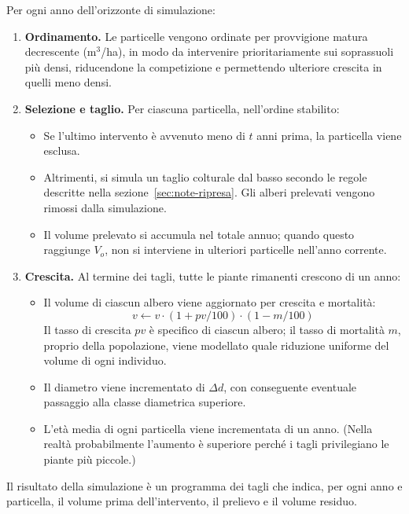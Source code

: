 \documentclass[a4paper,11pt]{article}
\begin{document}
Per ogni anno dell'orizzonte di simulazione:

\begin{enumerate}
    \item \textbf{Ordinamento.} Le particelle vengono ordinate per provvigione matura decrescente (m$^3$/ha), in modo da intervenire prioritariamente sui soprassuoli più densi, riducendone la competizione e permettendo ulteriore crescita in quelli meno densi.
    \item \textbf{Selezione e taglio.} Per ciascuna particella, nell'ordine stabilito:
    \begin{itemize}
        \item Se l'ultimo intervento è avvenuto meno di $t$ anni prima, la particella viene esclusa.
        \item Altrimenti, si simula un taglio colturale dal basso secondo le regole descritte nella sezione~\ref{sec:note-ripresa}. Gli alberi prelevati vengono rimossi dalla simulazione.
        \item Il volume prelevato si accumula nel totale annuo; quando questo raggiunge $V_o$, non si interviene in ulteriori particelle nell'anno corrente.
    \end{itemize}

    \item \textbf{Crescita.} Al termine dei tagli, tutte le piante rimanenti crescono di un anno:
    \begin{itemize}
        \item Il volume di ciascun albero viene aggiornato per crescita e mortalità:
        \[v \leftarrow v\cdot(1 + pv/100)\cdot(1 - m/100) \]
        Il tasso di crescita $pv$ è specifico di ciascun albero; il tasso di mortalità $m$, proprio della popolazione, viene modellato quale riduzione uniforme del volume di ogni individuo.
        \item Il diametro viene incrementato di $\Delta d$, con conseguente eventuale passaggio alla classe diametrica superiore.
        \item L'età media di ogni particella viene incrementata di un anno. (Nella realtà probabilmente l'aumento è superiore perché i tagli privilegiano le piante più piccole.)
    \end{itemize}
\end{enumerate}

Il risultato della simulazione è un programma dei tagli che indica, per ogni anno e particella, il volume prima dell'intervento, il prelievo e il volume residuo.
\end{document}
